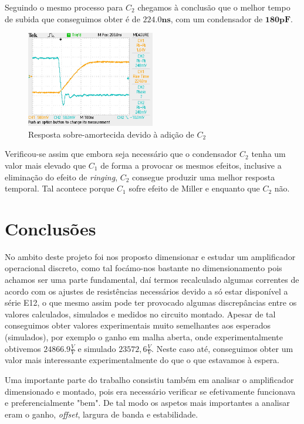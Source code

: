 \documentclass[a4paper]{article}
\begin{document}
        Seguindo o mesmo processo para $C_2$ chegamos à conclusão que o melhor tempo de subida que conseguimos obter é de $\bm{224.0ns}$, com um condensador de $\bm{180pF}$. 
        \begin{figure}[H]
            \centering
            \includegraphics[width=0.5\textwidth]{figura12_respostaC2.JPG}
            \caption{\label{fig:respostaC2}Resposta sobre-amortecida devido à adição de $C_2$}
        \end{figure}
        \medskip
        
        Verificou-se assim que embora seja necessário que o condensador $C_2$ tenha um valor mais elevado que $C_1$ de forma a provocar os mesmos efeitos, inclusive a eliminação do efeito de \emph{ringing}, $C_2$ consegue produzir uma melhor resposta temporal. Tal acontece porque $C_1$ sofre efeito de Miller e enquanto que $C_2$ não.
\clearpage

\section{Conclusões}
    No ambito deste projeto foi nos proposto dimensionar e estudar um amplificador operacional discreto, como tal focámo-nos bastante no dimensionamento pois achamos ser uma parte fundamental, daí termos recalculado algumas correntes de acordo com os ajustes de resistências necessários devido a só estar disponível a série E12, o que mesmo assim pode ter provocado algumas discrepâncias entre os valores calculados, simulados e medidos no circuito montado. Apesar de tal conseguimos obter valores experimentais muito semelhantes aos esperados (simulados), por exemplo o ganho em malha aberta, onde experimentalmente obtivemos $24866.9\frac{V}{V}$ e simulado $23572,6\frac{V}{V}$. Neste caso até, conseguimos obter um valor mais interessante experimentalmente do que o que estavamos à espera.
    
    Uma importante parte do trabalho consistiu também em analisar o amplificador dimensionado e montado, pois era necessário verificar se efetivamente funcionava e preferencialmente "bem". De tal modo os aspetos mais importantes a analisar eram o ganho, \emph{offset}, largura de banda e estabilidade.
    
\end{document}
